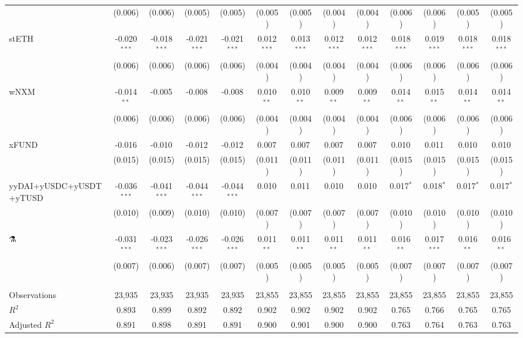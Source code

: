\begin{table}[!htbp]
\begin{tabular}{@{\extracolsep{5pt}}lcccccccccccc}
  & (0.006) & (0.006) & (0.005) & (0.005) & (0.005) & (0.005) & (0.004) & (0.004) & (0.006) & (0.006) & (0.005) & (0.005) \\
 stETH & -0.020$^{***}$ & -0.018$^{***}$ & -0.021$^{***}$ & -0.021$^{***}$ & 0.012$^{***}$ & 0.013$^{***}$ & 0.012$^{***}$ & 0.012$^{***}$ & 0.018$^{***}$ & 0.019$^{***}$ & 0.018$^{***}$ & 0.018$^{***}$ \\
  & (0.006) & (0.006) & (0.006) & (0.006) & (0.004) & (0.004) & (0.004) & (0.004) & (0.006) & (0.006) & (0.006) & (0.006) \\
 wNXM & -0.014$^{**}$ & -0.005$^{}$ & -0.008$^{}$ & -0.008$^{}$ & 0.010$^{**}$ & 0.010$^{**}$ & 0.009$^{**}$ & 0.009$^{**}$ & 0.014$^{**}$ & 0.015$^{**}$ & 0.014$^{**}$ & 0.014$^{**}$ \\
  & (0.006) & (0.006) & (0.006) & (0.006) & (0.004) & (0.004) & (0.004) & (0.004) & (0.006) & (0.006) & (0.006) & (0.006) \\
 xFUND & -0.016$^{}$ & -0.010$^{}$ & -0.012$^{}$ & -0.012$^{}$ & 0.007$^{}$ & 0.007$^{}$ & 0.007$^{}$ & 0.007$^{}$ & 0.010$^{}$ & 0.011$^{}$ & 0.010$^{}$ & 0.010$^{}$ \\
  & (0.015) & (0.015) & (0.015) & (0.015) & (0.011) & (0.011) & (0.011) & (0.011) & (0.015) & (0.015) & (0.015) & (0.015) \\
 yyDAI+yUSDC+yUSDT+yTUSD & -0.036$^{***}$ & -0.041$^{***}$ & -0.044$^{***}$ & -0.044$^{***}$ & 0.010$^{}$ & 0.011$^{}$ & 0.010$^{}$ & 0.010$^{}$ & 0.017$^{*}$ & 0.018$^{*}$ & 0.017$^{*}$ & 0.017$^{*}$ \\
  & (0.010) & (0.009) & (0.010) & (0.010) & (0.007) & (0.007) & (0.007) & (0.007) & (0.010) & (0.010) & (0.010) & (0.010) \\
 ⚗️ & -0.031$^{***}$ & -0.023$^{***}$ & -0.026$^{***}$ & -0.026$^{***}$ & 0.011$^{**}$ & 0.011$^{**}$ & 0.011$^{**}$ & 0.011$^{**}$ & 0.016$^{**}$ & 0.017$^{***}$ & 0.016$^{**}$ & 0.016$^{**}$ \\
  & (0.007) & (0.006) & (0.007) & (0.007) & (0.005) & (0.005) & (0.005) & (0.005) & (0.007) & (0.007) & (0.007) & (0.007) \\
\hline \\[-1.8ex]
 Observations & 23,935 & 23,935 & 23,935 & 23,935 & 23,855 & 23,855 & 23,855 & 23,855 & 23,855 & 23,855 & 23,855 & 23,855 \\
 $R^2$ & 0.893 & 0.899 & 0.892 & 0.892 & 0.902 & 0.902 & 0.902 & 0.902 & 0.765 & 0.766 & 0.765 & 0.765 \\
 Adjusted $R^2$ & 0.891 & 0.898 & 0.891 & 0.891 & 0.900 & 0.901 & 0.900 & 0.900 & 0.763 & 0.764 & 0.763 & 0.763 \\

\end{tabular}
\end{table}
